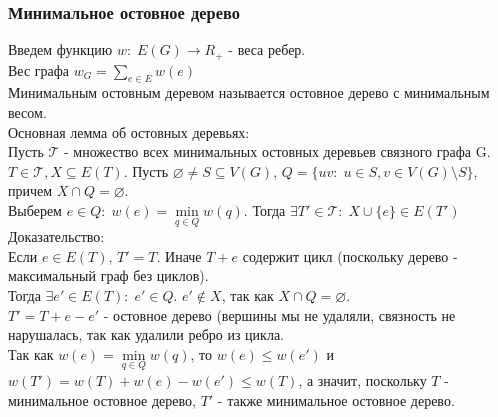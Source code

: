\subsubsection{Минимальное остовное дерево}
Введем функцию $w: \; E(G) \rightarrow R_+$ - веса ребер.\\
Вес графа $w_G = \sum\limits_{e \in E}w(e)$\\
Минимальным остовным деревом называется остовное дерево с минимальным весом.\\
Основная лемма об остовных деревьях:\\
Пусть $\mathcal{T}$ - множество всех минимальных остовных деревьев связного графа G.\\
$T \in \mathcal{T}, X \subseteq E(T)$. Пусть $\varnothing \not= S \subseteq V(G)$, $Q = \{uv: \; u \in S, v \in V(G) \setminus S\}$, причем $X \cap Q = \varnothing$.\\
Выберем $e \in Q: \; w(e) = \min\limits_{q \in Q}w(q)$. Тогда $\exists T' \in \mathcal{T}: \; X \cup \{e\} \in E(T')$\\
Доказательство:\\
Если $e \in E(T)$, $T' = T$. Иначе $T + e$ содержит цикл (поскольку дерево - максимальный граф без циклов).\\
Тогда $\exists e' \in E(T): \; e' \in Q$. $e' \not\in X$, так как $X \cap Q = \varnothing$.\\
$T' = T + e - e'$ - остовное дерево (вершины мы не удаляли, связность не нарушалась, так как удалили ребро из цикла.\\
Так как $w(e) = \min\limits_{q \in Q}w(q)$, то $w(e) \leq w(e')$ и $w(T') = w(T) + w(e) - w(e') \leq w(T)$, а значит, поскольку $T$ - минимальное остовное дерево, $T'$ - также минимальное остовное дерево.
